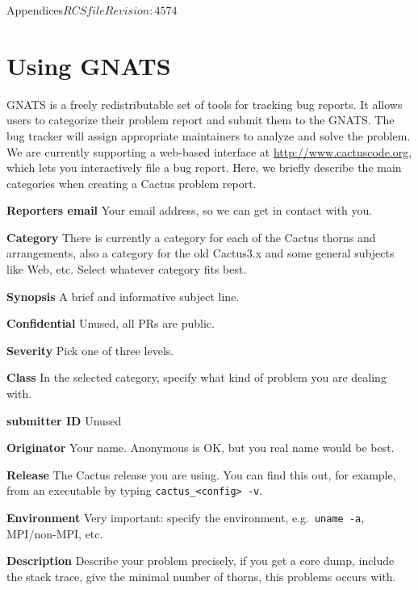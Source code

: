 \begin{cactuspart}{Appendices}{$RCSfile$}{$Revision: 4574 $}
\chapter{Using GNATS}
\label{sec:Appendix.gnats}
GNATS is a freely redistributable set of tools for tracking bug
reports. It allows users to categorize their problem report and submit
them to the GNATS. The bug tracker will assign appropriate maintainers
to analyze and solve the problem.
We are currently supporting a web-based interface at
\url{http://www.cactuscode.org}, which lets you
interactively file a bug report. Here, we briefly
describe the main categories when creating a Cactus
problem report.
\begin{Lentry}
\item[{\bf Reporters email}] Your email address, so we can get in
contact with you.
\item[{\bf Category}] There is currently a category for each of the
Cactus thorns and arrangements, also a category for the old Cactus3.x and
some general subjects like Web, etc. Select whatever category fits
best.
\item[{\bf Synopsis}] A brief and informative subject line.

\item[{\bf Confidential}] Unused, all PRs are public.

\item[{\bf Severity}] Pick one of three levels.

\item[{\bf Class}] In the selected category, specify what kind of
problem you are dealing with.

\item[{\bf submitter ID}] Unused

\item[{\bf Originator}] Your name. Anonymous is OK, but you real name
   would be best.

\item[{\bf Release}] The Cactus release you are using. You can find this
   out, for example, from an executable by typing {\tt cactus\_<config> -v}.

\item[{\bf Environment}] Very important: specify the environment,
e.g.\ {\tt uname -a}, MPI/non-MPI, etc.

\item[{\bf Description}] Describe your problem precisely, if you get a
core dump, include the stack trace, give the minimal number of thorns,
this problems occurs with.


\end{Lentry}
\end{cactuspart}
